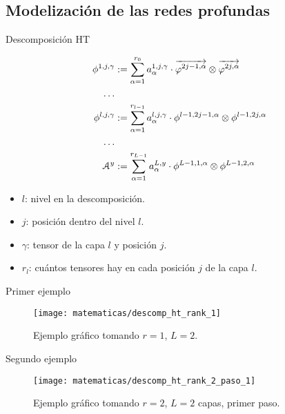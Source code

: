 \subsection{Modelización de las redes profundas}
\begin{frame}{Descomposición HT}

	\begin{equation} \label{eq:descomposicion_ht}
		\begin{split}
			\phi^{1, j, \gamma} &:= \sum_{\alpha = 1}^{r_0} a_{\alpha}^{1, j, \gamma} \cdot \overrightarrow{\varphi^{2j-1, \alpha}} \otimes \overrightarrow{\varphi^{2j, \alpha}} \\
			\ldots \\
			\phi^{l, j, \gamma} &:= \sum_{\alpha = 1}^{r_{l-1}} a_{\alpha}^{l, j, \gamma} \cdot \phi^{l-1, 2j-1, \alpha} \otimes \phi^{l-1, 2j, \alpha} \\
			\ldots \\
			\mathcal{A}^y &:= \sum_{\alpha = 1}^{r_{L-1}} a_{\alpha}^{L, y} \cdot \phi^{L-1, 1, \alpha} \otimes \phi^{L-1, 2, \alpha}
		\end{split}
	\end{equation}

	\begin{itemize}
		\item $l$: nivel en la descomposición.
		\item $j$: posición dentro del nivel $l$.
		\item $\gamma$: tensor de la capa $l$ y posición $j$.
		\item $r_l$: cuántos tensores hay en cada posición $j$ de la capa $l$.
	\end{itemize}

\end{frame}

\begin{frame}{Primer ejemplo}

	\begin{figure}
		\centering
		\texttt{[image: matematicas/descomp\_ht\_rank\_1]}
		\caption{Ejemplo gráfico tomando $r = 1$, $L = 2$.}
		\label{img:diagrama_ht_simple}
	\end{figure}

\end{frame}

\begin{frame}{Segundo ejemplo}

	\begin{figure}
		\texttt{[image: matematicas/descomp\_ht\_rank\_2\_paso\_1]}
		\caption{Ejemplo gráfico tomando $r = 2$, $L = 2$ capas, primer paso.}
	\end{figure}

\end{frame}


